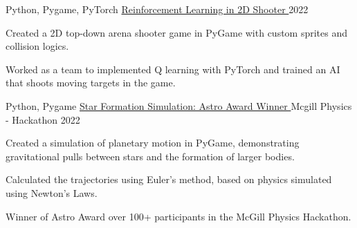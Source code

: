 

\begin{cventries}

  \cventry
    {Python, Pygame, PyTorch} %
    {\href{https://github.com/shiqui/TSDP-Reinforcement-Learning-in-Video-Games}{Reinforcement Learning in 2D Shooter {\faLink}}} %
    {} %
    {2022} %
    {
      \begin{cvitems} %
        \item {Created a 2D top-down arena shooter game in PyGame with custom sprites and collision logics.}
        \item {Worked as a team to implemented Q learning with PyTorch and trained an AI that shoots moving targets in the game.}
      \end{cvitems}
    }

  \cventry
    {Python, Pygame} %
    {\href{https://devpost.com/software/star-formation}{Star Formation Simulation: Astro Award Winner {\faLink}}} %
    {Mcgill Physics - Hackathon} %
    {2022} %
    {
      \begin{cvitems} %
        \item {Created a simulation of planetary motion in PyGame, demonstrating gravitational pulls between stars and the formation of larger bodies.}
        \item {Calculated the trajectories using Euler's method, based on physics simulated using Newton's Laws.}
        \item {Winner of Astro Award over 100+ participants in the McGill Physics Hackathon. }
      \end{cvitems}
    }
    

\end{cventries}
